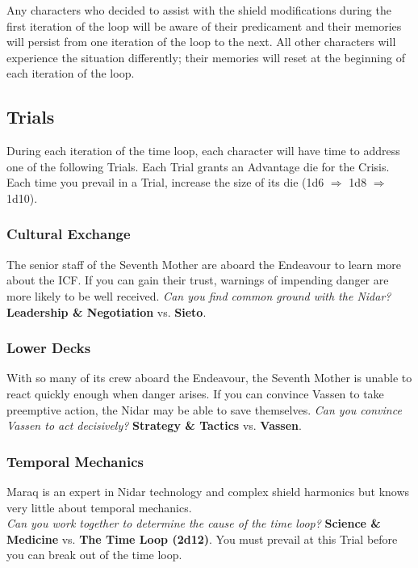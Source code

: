 \documentclass[11pt, a5paper, parskip=half-, DIV=12]{scrartcl}
\begin{document}
Any characters who decided to assist with the shield modifications during the first iteration of the loop will be aware of their predicament and their memories will persist from one iteration of the loop to the next. All other characters will experience the situation differently; their memories will reset at the beginning of each iteration of the loop.
\newpage

\subsection*{Trials}
During each iteration of the time loop, each character will have time to address one of the following Trials.
Each Trial grants an Advantage die for the Crisis. Each time you prevail in a Trial, increase the size of its die (1d6 $\Longrightarrow$ 1d8 $\Longrightarrow$ 1d10). 

\subsubsection*{Cultural Exchange}
The senior staff of the Seventh Mother
are aboard the Endeavour to learn more about the ICF.
If you can gain their trust, warnings of impending danger are more likely to be well received. \textit{Can you find common ground with the Nidar?} \textbf{Leadership \& Negotiation} vs. \textbf{Sieto}.

\subsubsection*{Lower Decks}
With so many of its crew aboard the Endeavour, the Seventh Mother is unable to react quickly enough when danger arises. If you can convince Vassen to take preemptive action, the Nidar may be able to save themselves. \textit{Can you convince Vassen to act decisively?} \textbf{Strategy \& Tactics} vs. \textbf{Vassen}.

\subsubsection*{Temporal Mechanics}
Maraq is an expert in Nidar technology and complex shield harmonics but knows very little about temporal mechanics.
\\ \textit{Can you work together to determine the cause of the time loop?} \textbf{Science \& Medicine} vs. \textbf{The Time Loop (2d12)}. You must prevail at this Trial before you can break out of the time loop.
\end{document}
